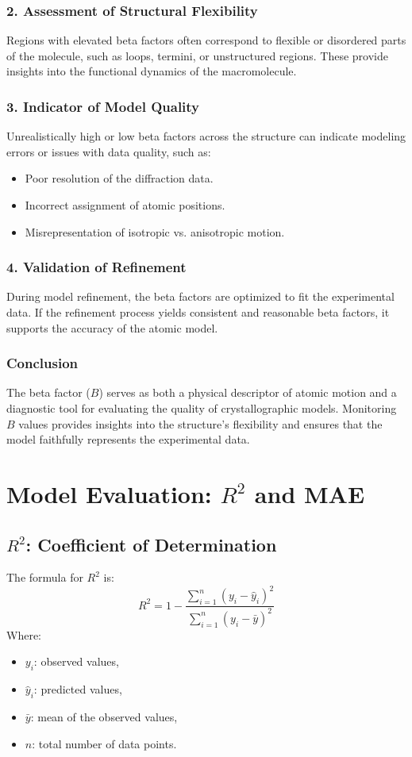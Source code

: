 \documentclass[English, Lau, oneside]{sapthesis}
\begin{document}
\begin{itemize}
\subsubsection*{2. Assessment of Structural Flexibility}
Regions with elevated beta factors often correspond to flexible or disordered parts of the molecule, such as loops, termini, or unstructured regions. These provide insights into the functional dynamics of the macromolecule.

\subsubsection*{3. Indicator of Model Quality}
Unrealistically high or low beta factors across the structure can indicate modeling errors or issues with data quality, such as:
\begin{itemize}
    \item Poor resolution of the diffraction data.
    \item Incorrect assignment of atomic positions.
    \item Misrepresentation of isotropic vs. anisotropic motion.
\end{itemize}

\subsubsection*{4. Validation of Refinement}
During model refinement, the beta factors are optimized to fit the experimental data. If the refinement process yields consistent and reasonable beta factors, it supports the accuracy of the atomic model.

\subsubsection*{Conclusion}
The beta factor ($B$) serves as both a physical descriptor of atomic motion and a diagnostic tool for evaluating the quality of crystallographic models. Monitoring $B$ values provides insights into the structure's flexibility and ensures that the model faithfully represents the experimental data.

\section*{Model Evaluation: \(R^2\) and MAE}

\subsection*{\(R^2\): Coefficient of Determination}
The formula for \(R^2\) is:
\[
R^2 = 1 - \frac{\sum_{i=1}^n (y_i - \hat{y}_i)^2}{\sum_{i=1}^n (y_i - \bar{y})^2}
\]
Where:
\begin{itemize}
    \item \(y_i\): observed values,
    \item \(\hat{y}_i\): predicted values,
    \item \(\bar{y}\): mean of the observed values,
    \item \(n\): total number of data points.
\end{itemize}


\end{itemize}
\end{document}
